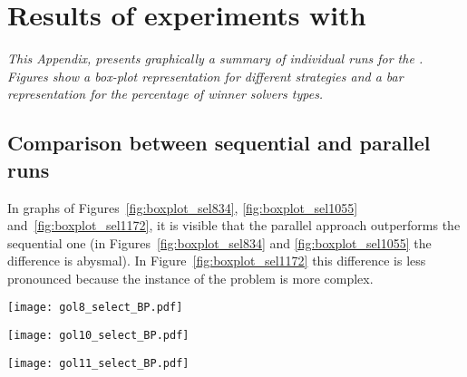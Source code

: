 \chapter{Results of experiments with \grp}
\label{app:grp}
\textit{This Appendix, presents graphically a summary of individual runs for the \grp. Figures show a \textit{box-plot} representation for different strategies and a bar representation for the percentage of winner solvers types.}

\vspace{2ex}\vfill
\minitoc
\newpage

\section{Comparison between sequential and parallel runs}

\begin{minipage}[c]{0.45\textwidth}
In graphs of Figures~\ref{fig:boxplot_sel834}, \ref{fig:boxplot_sel1055} and~\ref{fig:boxplot_sel1172}, it is visible that the parallel approach outperforms the sequential one (in Figures~\ref{fig:boxplot_sel834} and \ref{fig:boxplot_sel1055} the difference is abysmal). In Figure~\ref{fig:boxplot_sel1172} this difference is less pronounced because the instance of the problem is more complex.
\end{minipage}
\hspace{0.05\textwidth}
\begin{minipage}[c]{0.45\textwidth}
\centering
\texttt{[image: gol8\_select\_BP.pdf]}
\label{fig:boxplot_sel834}
\end{minipage}


\begin{minipage}[c]{0.45\textwidth}
\centering
\texttt{[image: gol10\_select\_BP.pdf]}
\label{fig:boxplot_sel1055}
\end{minipage}\hspace{0.05\textwidth}
\begin{minipage}[c]{0.45\textwidth}
\centering
\texttt{[image: gol11\_select\_BP.pdf]}
\label{fig:boxplot_sel1172}
\end{minipage}


